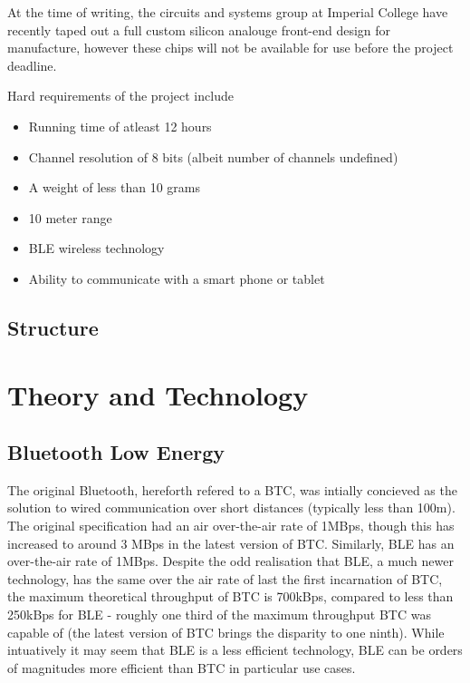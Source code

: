 \documentclass[]{article}
\begin{document}
 At the time of writing, the circuits and systems group at Imperial College have recently taped out a full custom silicon analouge front-end design for manufacture, however these chips will not be available for use before the project deadline. 


Hard requirements of the project include 
\begin{itemize}
	\item Running time of atleast 12 hours
	\item Channel resolution of 8 bits (albeit number of channels undefined)
	\item A weight of less than 10 grams
	\item 10 meter range
	\item BLE wireless technology
	\item Ability to communicate with a smart phone or tablet
\end{itemize}

\subsection {Structure}

\clearpage
\section{Theory and Technology}
\subsection{Bluetooth Low Energy}
The original Bluetooth, hereforth refered to a \ac{BTC}, was intially concieved as the solution to wired communication over short distances (typically less than 100m). The original specification had an air over-the-air rate of 1MBps, though this has increased to around 3 MBps in the latest version of \ac{BTC}. Similarly, BLE has an over-the-air rate of 1MBps. Despite the odd realisation that \ac{BLE}, a much newer technology, has the same over the air rate of last the first incarnation of \ac{BTC}, the maximum theoretical throughput of \ac{BTC} is 700kBps, compared to less than 250kBps for \ac{BLE} - roughly one third of the maximum throughput \ac{BTC} was capable of (the latest version of \ac{BTC} brings the disparity to one ninth). While intuatively it may seem that \ac{BLE} is a less efficient technology, \ac{BLE} can be orders of magnitudes more efficient than \ac{BTC} in particular use cases.
\end{document}
